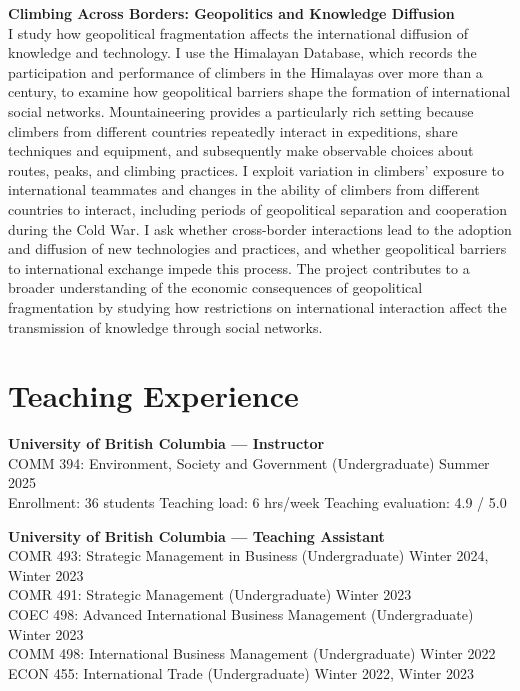 \documentclass[11pt]{article}
\begin{document}
\bigskip
\noindent
\textbf{Climbing Across Borders: Geopolitics and Knowledge Diffusion} \\
{\small I study how geopolitical fragmentation affects the international diffusion of knowledge and technology. I use the Himalayan Database, which records the participation and performance of climbers in the Himalayas over more than a century, to examine how geopolitical barriers shape the formation of international social networks. Mountaineering provides a particularly rich setting because climbers from different countries repeatedly interact in expeditions, share techniques and equipment, and subsequently make observable choices about routes, peaks, and climbing practices. I exploit variation in climbers' exposure to international teammates and changes in the ability of climbers from different countries to interact, including periods of geopolitical separation and cooperation during the Cold War. I ask whether cross-border interactions lead to the adoption and diffusion of new technologies and practices, and whether geopolitical barriers to international exchange impede this process. The project contributes to a broader understanding of the economic consequences of geopolitical fragmentation by studying how restrictions on international interaction affect the transmission of knowledge through social networks.}


\section*{Teaching Experience}

\textbf{University of British Columbia — Instructor}\\
COMM 394: Environment, Society and Government (Undergraduate) \hfill Summer 2025 \\
Enrollment: 36 students \quad Teaching load: 6 hrs/week \quad Teaching evaluation: 4.9 / 5.0 \\

\vspace{0.4em}

\noindent
\textbf{University of British Columbia — Teaching Assistant}\\
COMR 493: Strategic Management in Business (Undergraduate) \hfill Winter 2024, Winter 2023 \\
COMR 491: Strategic Management (Undergraduate) \hfill Winter 2023 \\
COEC 498: Advanced International Business Management (Undergraduate) \hfill Winter 2023 \\
COMM 498: International Business Management (Undergraduate) \hfill Winter 2022 \\
ECON 455: International Trade (Undergraduate) \hfill Winter 2022, Winter 2023 \\
\end{document}
